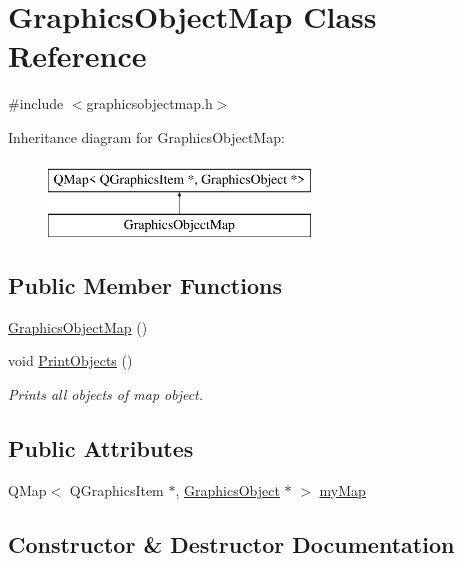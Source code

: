 \hypertarget{class_graphics_object_map}{}\section{Graphics\+Object\+Map Class Reference}
\label{class_graphics_object_map}


{\ttfamily \#include $<$graphicsobjectmap.\+h$>$}

Inheritance diagram for Graphics\+Object\+Map\+:\begin{figure}[H]
\begin{center}
\leavevmode
\includegraphics[height=2.000000cm]{class_graphics_object_map}
\end{center}
\end{figure}
\subsection*{Public Member Functions}
\begin{DoxyCompactItemize}
\item 
\hyperlink{class_graphics_object_map_a31e38788b129d655fa53e26d489cbf8c}{Graphics\+Object\+Map} ()
\item 
void \hyperlink{class_graphics_object_map_a5e9632b78470d797613114dae0382028}{Print\+Objects} ()
\begin{DoxyCompactList}\small\item\em Prints all objects of map object. \end{DoxyCompactList}\end{DoxyCompactItemize}
\subsection*{Public Attributes}
\begin{DoxyCompactItemize}
\item 
Q\+Map$<$ Q\+Graphics\+Item $\ast$, \hyperlink{class_graphics_object}{Graphics\+Object} $\ast$ $>$ \hyperlink{class_graphics_object_map_a6b59cd95bfc0fcbec8037e12edc7a3e1}{my\+Map}
\end{DoxyCompactItemize}


\subsection{Constructor \& Destructor Documentation}
\mbox{\label{class_graphics_object_map_a31e38788b129d655fa53e26d489cbf8c}} 
